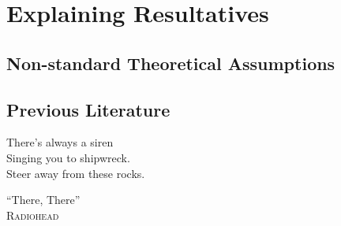\documentclass[
	12pt,
	twoside,
	narrowmargins
	]{ut-thesis}
\theoremstyle{definition}
\begin{document}
\part{Explaining Resultatives}\label{sec:part1}
%
%
\chapter{Non-standard Theoretical Assumptions}\label{sec:nonstandard}

\chapter{Previous Literature}\label{sec:litreview}
\epigraph{
  There's always a siren\\
  Singing you to shipwreck.\\
  Steer away from these rocks.
}{``There, There''\\\textsc{Radiohead}}

\end{document}
